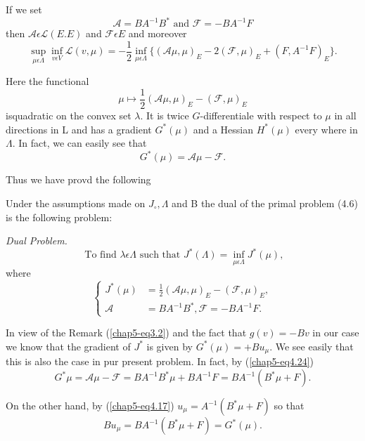 If we set
\begin{equation*}
\mathscr{A} = BA^{-1} B^{*} \text{ and } \mathscr{F} = -BA^{-1} F\tag{4.19}\label{chap5-eq4.19} 
\end{equation*}
then $\mathscr{A} \epsilon \mathscr{L} (E . E)$ and $\mathscr{F} \epsilon E$ and moreover
\begin{equation*}
\sup_{\mu \epsilon \Lambda} \inf_{v \epsilon V} \mathscr{L} (v, \mu) = -\frac{1}{2} \inf_{\mu \epsilon \Lambda} \{(\mathscr{A} \mu, \mu)_{E} - 2(\mathscr{F}, \mu)_{E} + (F, A^{-1} F)_{E} \}.\tag{4.20}\label{chap5-eq4.20}
\end{equation*}

Here the functional
\begin{equation*}
\mu \mapsto \frac{1}{2} (\mathscr{A} \mu, \mu)_{E} - (\mathscr{F}, \mu)_{E}\tag{4.21}\label{chap5-eq4.21}
\end{equation*}
is\pageoriginale quadratic on the convex set $\lambda$. It is twice $G$-differentiale with respect to $\mu$ in all directions in L and has a gradient $G^{*}(\mu)$ and a Hessian $H^{*}(\mu)$ every where in $\Lambda$. In fact, we can easily see that
\begin{equation*}
G^{*} (\mu) = \mathscr{A} \mu - \mathscr{F}.\tag{4.22}\label{chap5-eq4.22}
\end{equation*}

Thus we have provd the following

\begin{proposition}\label{chap5-prop4.2}
Under the assumptions made on $J_{\circ}, \Lambda$ and B the dual of the primal problem (4.6) is the following problem:

{\em Dual Problem.}
\begin{equation*}
\text{ To find } \lambda \epsilon \Lambda \text{ such that } J^{*} (\Lambda) = \inf_{\mu \epsilon \Lambda} J^{*}(\mu),\tag{4.23}\label{chap5-eq4.23}
\end{equation*}
where
\begin{equation*}
\begin{cases}
 J^{*} (\mu) & = \frac{1}{2} (\mathscr{A} \mu, \mu)_{E} - (\mathscr{F}, \mu)_{E},\\
 \mathscr{A} & = BA^{-1} B^{*}, \mathscr{F} = -BA^{-1} F.\tag{4.24}\label{chap5-eq4.24}
\end{cases}
\end{equation*}
\end{proposition}

\begin{remark}\label{chap5-rem4.1}
In view of the Remark (\ref{chap5-eq3.2}) and the fact that $g(v) = -Bv$ in our case we know that the gradient of $J^{*}$ is given by $G^{*} (\mu) = + Bu_{\mu}$. We see easily that this is also the case in pur present problem. In fact, by (\ref{chap5-eq4.24})
$$
G^{*} \mu = \mathscr{A}\mu -\mathscr{F} = BA^{-1} B^{*} \mu + BA^{-1} F = BA^{-1} (B^{*} \mu + F).
$$ 

On the other hand, by (\ref{chap5-eq4.17}) $u_{\mu} = A^{-1} (B^{*} \mu + F)$ so that
$$
Bu_{\mu} = BA^{-1} (B^{*} \mu + F) = G^{*} (\mu).
$$
\end{remark}

